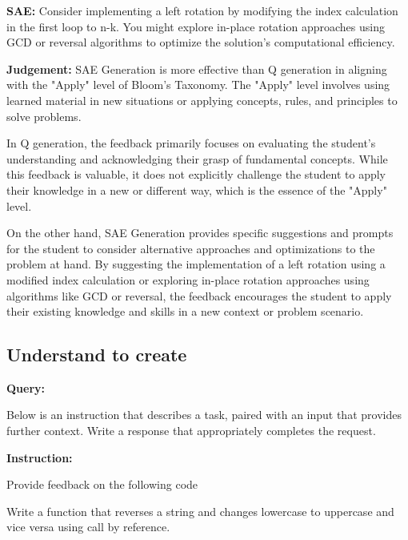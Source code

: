 \textbf{SAE:} Consider implementing a left rotation by modifying the index calculation in the first loop to n-k. You might explore in-place rotation approaches using GCD or reversal algorithms to optimize the solution's computational efficiency. \par
\textbf{Judgement:} SAE Generation  is more effective than Q generation in aligning with the "Apply" level of Bloom's Taxonomy. The "Apply" level involves using learned material in new situations or applying concepts, rules, and principles to solve problems.

In Q generation, the feedback primarily focuses on evaluating the student's understanding and acknowledging their grasp of fundamental concepts. While this feedback is valuable, it does not explicitly challenge the student to apply their knowledge in a new or different way, which is the essence of the "Apply" level.

On the other hand, SAE Generation  provides specific suggestions and prompts for the student to consider alternative approaches and optimizations to the problem at hand. By suggesting the implementation of a left rotation using a modified index calculation or exploring in-place rotation approaches using algorithms like GCD or reversal, the feedback encourages the student to apply their existing knowledge and skills in a new context or problem scenario.
\medskip

\subsection*{Understand to create}



\textbf{Query:}

Below is an instruction that describes a task, paired with an input that provides further context. Write a response that appropriately completes the request.\par
\textbf{Instruction:}\par
Provide feedback on the following code \par
Write a function that reverses a string and changes lowercase to uppercase and vice versa using call by reference.\par

